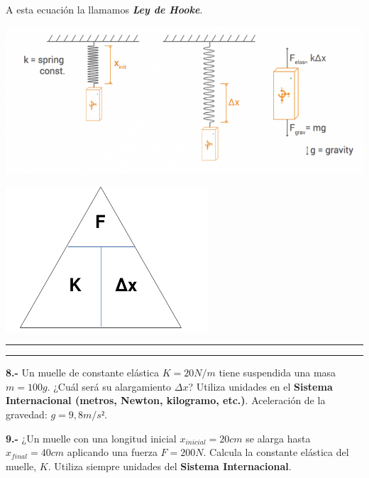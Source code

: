 \documentclass[
  letterpaper,
  DIV=11,
  numbers=noendperiod]{scrreprt}
\begin{document}
A esta ecuación la llamamos \textbf{\emph{Ley de Hooke}}.

\begin{center}
\includegraphics[width=5.94792in,height=\textheight]{Screen Shot 2017-06-01 at 12.46.01 PM.png}
\end{center}

\begin{center}
\includegraphics[width=2.97917in,height=\textheight]{Untitled 1.png}
\end{center}

\begin{center}\rule{0.5\linewidth}{0.5pt}\end{center}

\begin{center}\rule{0.5\linewidth}{0.5pt}\end{center}

\textbf{8.-} Un muelle de constante elástica \(K=20N/m\) tiene
suspendida una masa \(m=100g\). ¿Cuál será su alargamiento \(\Delta x\)?
Utiliza unidades en el \textbf{Sistema Internacional (metros, Newton,
kilogramo, etc.)}. Aceleración de la gravedad: \(g=9,8 m/s²\).

\textbf{9.-} ¿Un muelle con una longitud inicial \(x_{inicial}=20cm\) se
alarga hasta \(x_{final}=40cm\) aplicando una fuerza \(F=200N\). Calcula
la constante elástica del muelle, \(K\). Utiliza siempre unidades del
\textbf{Sistema Internacional}.

\end{document}

